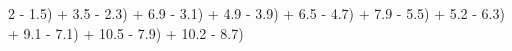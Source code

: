 \documentclass[preview]{standalone}
\begin{document}
\begin{center}
2 - 1.5) + 3.5 - 2.3) + 6.9 - 3.1) + 4.9 - 3.9) + 6.5 - 4.7) + 7.9 - 5.5) + 5.2 - 6.3) + 9.1 - 7.1) + 10.5 - 7.9) + 10.2 - 8.7)
\end{center}
\end{document}
